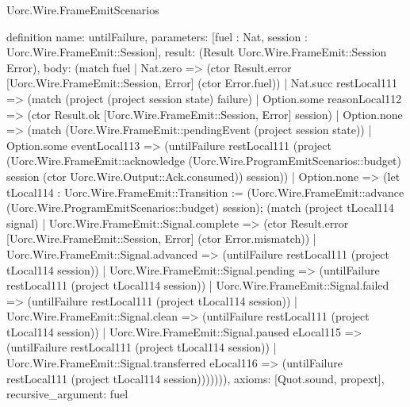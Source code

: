 \begin{lexlean}{Uorc.Wire.FrameEmitScenarios}
\begin{semanticmodule}
definition{
  name: untilFailure,
  parameters: [fuel : Nat, session : Uorc.Wire.FrameEmit::Session],
  result: (Result Uorc.Wire.FrameEmit::Session Error),
  body: (match fuel
    | Nat.zero => (ctor Result.error [Uorc.Wire.FrameEmit::Session, Error] (ctor Error.fuel))
    | Nat.succ restLocal111 => (match (project (project session state) failure)
      | Option.some reasonLocal112 => (ctor Result.ok [Uorc.Wire.FrameEmit::Session, Error] session)
      | Option.none => (match (Uorc.Wire.FrameEmit::pendingEvent (project session state))
        | Option.some eventLocal113 => (untilFailure restLocal111 (project (Uorc.Wire.FrameEmit::acknowledge (Uorc.Wire.ProgramEmitScenarios::budget) session (ctor Uorc.Wire.Output::Ack.consumed)) session))
        | Option.none => (let tLocal114 : Uorc.Wire.FrameEmit::Transition := (Uorc.Wire.FrameEmit::advance (Uorc.Wire.ProgramEmitScenarios::budget) session); (match (project tLocal114 signal)
          | Uorc.Wire.FrameEmit::Signal.complete => (ctor Result.error [Uorc.Wire.FrameEmit::Session, Error] (ctor Error.mismatch))
          | Uorc.Wire.FrameEmit::Signal.advanced => (untilFailure restLocal111 (project tLocal114 session))
          | Uorc.Wire.FrameEmit::Signal.pending => (untilFailure restLocal111 (project tLocal114 session))
          | Uorc.Wire.FrameEmit::Signal.failed => (untilFailure restLocal111 (project tLocal114 session))
          | Uorc.Wire.FrameEmit::Signal.clean => (untilFailure restLocal111 (project tLocal114 session))
          | Uorc.Wire.FrameEmit::Signal.paused eLocal115 => (untilFailure restLocal111 (project tLocal114 session))
          | Uorc.Wire.FrameEmit::Signal.transferred eLocal116 => (untilFailure restLocal111 (project tLocal114 session))))))),
  axioms: [Quot.sound, propext],
  recursive_argument: fuel
}


\end{semanticmodule}
\end{lexlean}
